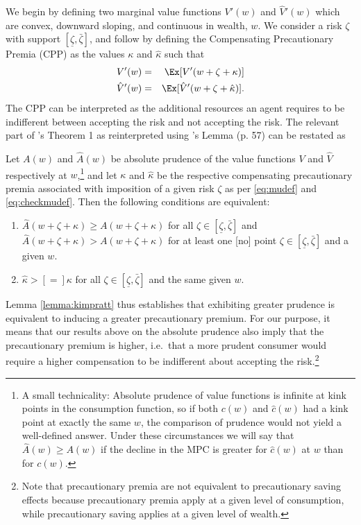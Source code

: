 We begin by defining two marginal value functions $V'(w)$ and $\hat{V}'(w)$ which are convex, downward sloping, and continuous in wealth, $w$. We consider a risk $\zeta$ with support $[\underline{\zeta},\bar{\zeta}]$, and follow \citet{kimball:smallandlarge} by defining the Compensating Precautionary Premia (CPP) as the values $\kappa$ and $\hat{\kappa}$ such that
\begin{eqnarray}
V'(w) & = & \Ex[V'(w + \zeta + \kappa)] \label{eq:mudef}
\\ \hat{V}'(w) & = & \Ex[\hat{V}'(w + \zeta + \hat{\kappa})] \label{eq:checkmudef}.
\end{eqnarray}
The CPP can be interpreted as the additional resources an agent requires to be indifferent between accepting the risk and not accepting the risk. The relevant part of \citet{pratt:smallandlarge}'s Theorem 1 as reinterpreted using \citet{kimball:smallandlarge}'s Lemma (p. 57) can be restated as
\begin{lemma}\label{lemma:kimpratt}
	Let $A(w)$ and $\hat{A}(w)$ be absolute prudence of the value functions $V$ and $\hat{V}$ respectively at $w$,\footnote{A small technicality: Absolute prudence of value functions is infinite at kink points in the consumption function, so if both $c(w)$ and $\hat{c}(w)$ had a 		kink point at exactly the same $w$, the comparison of prudence would not yield a well-defined answer. Under these circumstances we will say that $\hat{A}(w) \geq A(w)$ if the decline in the MPC is greater for $\hat{c}(w)$ at $w$ than for $c(w)$. } and let $\kappa$ and $\hat{\kappa}$ be the respective compensating precautionary premia associated with imposition of a given risk $\zeta$ as per \eqref{eq:mudef} and \eqref{eq:checkmudef}. Then the following conditions are equivalent:
	\begin{enumerate}
		\item $\hat{A}(w + \zeta+\kappa) \geq A(w + \zeta+\kappa)$ for all $\zeta \in [\underline{\zeta},\bar{\zeta}]$ and $\hat{A}(w + \zeta+\kappa) > A(w + \zeta+\kappa)$ for at least one [no] point $\zeta \in [\underline{\zeta},\bar{\zeta}]$ and a given $w$.
		\item $\hat{\kappa} > [=] \kappa$ for all $\zeta \in [\underline{\zeta},\bar{\zeta}]$ and the same given $w$.
	\end{enumerate}
\end{lemma}

Lemma \ref{lemma:kimpratt} thus establishes that exhibiting greater prudence is equivalent to inducing a greater precautionary premium. For our purpose, it means that our results above on the absolute prudence also imply that the precautionary premium is higher, i.e.\ that a more prudent consumer would require a higher compensation to be indifferent about accepting the risk.\footnote{Note that precautionary premia are not equivalent to precautionary saving effects because precautionary premia apply at a given level of consumption, while precautionary saving applies at a given level of wealth.}

